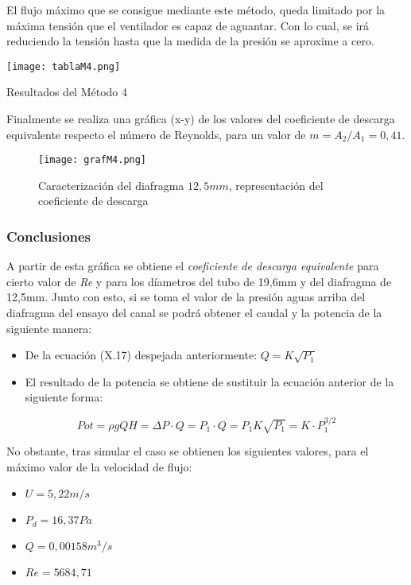 El flujo máximo que se consigue mediante este método, queda limitado por
la máxima tensión que el ventilador es capaz de aguantar. Con lo cual,
se irá reduciendo la tensión hasta que la medida de la presión se
aproxime a cero.\\

\begin{table}
\centering
\texttt{[image: tablaM4.png]}
\caption{Resultados del Método 4}
\label{tab:tablaM4}
\end{table}

Finalmente se realiza una gráfica (x-y) de los valores del coeficiente
de descarga equivalente respecto el número de Reynolds, para un valor de
\(m=A_2/A_1=0,41\).

\begin{figure}
\centering
\texttt{[image: grafM4.png]}
\caption[Caracterización del diafragma $12,5mm$]{Caracterización del diafragma $12,5mm$, representación del coeficiente de descarga}
\label{fig:grafM4}
\end{figure}

\subsubsection{Conclusiones}\label{header-n423}

A partir de esta gráfica se obtiene el \emph{coeficiente de descarga
equivalente} para cierto valor de \emph{Re} y para los díametros del
tubo de 19,6mm y del diafragma de 12,5mm. Junto con esto, si se toma el
valor de la presión aguas arriba del diafragma del ensayo del canal se
podrá obtener el caudal y la potencia de la siguiente manera:

\begin{itemize}
\item
  De la ecuación (X.17) despejada anteriormente: \(Q=K\sqrt{P_1}\)
\item
  El resultado de la potencia se obtiene de sustituir la ecuación
  anterior de la siguiente forma:
\end{itemize}

\[Pot= \rho g Q H = \Delta P · Q=P_1·Q=P_1K\sqrt{P_1}=K·P_1^{3/2}\]

No obstante, tras simular el caso se obtienen los siguientes valores,
para el máximo valor de la velocidad de flujo:

\begin{itemize}
\item
  \(U=5,22 m/s\)
\item
  \(P_d=16,37Pa\)
\item
  \(Q=0,00158m^3/s\)
\item
  \(Re=5684,71\)
\end{itemize}

